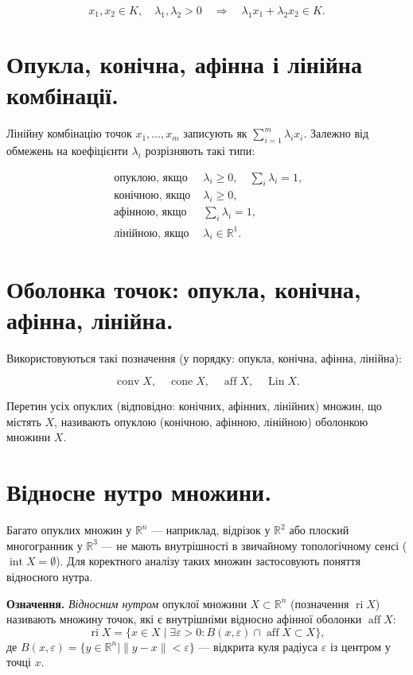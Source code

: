 \documentclass[12pt,a4paper]{extarticle}
\numberwithin{section}{part}
\begin{document}
$$
x_{1}, x_{2} \in K, \quad \lambda_{1}, \lambda_{2}>0 \quad \Longrightarrow \quad \lambda_{1} x_{1}+\lambda_{2} x_{2} \in K .
$$

\section{Опукла, конічна, афінна і лінійна комбінації.}
Лінійну комбінацію точок $x_{1}, \ldots, x_{m}$ записують як $\sum_{i=1}^{m} \lambda_{i} x_{i}$. Залежно від обмежень на коефіцієнти $\lambda_i$ розрізняють такі типи:

$$
\begin{array}{ll}
\text { опуклою, якщо } & \lambda_{i} \geq 0, \quad \sum_{i} \lambda_{i}=1, \\
\text { конічною, якщо } & \lambda_{i} \geq 0, \\
\text { афінною, якщо } & \sum_{i} \lambda_{i}=1, \\
\text { лінійною, якщо } & \lambda_{i} \in \mathbb{R}^{1} .
\end{array}
$$

\section{Оболонка точок: опукла, конічна, афінна, лінійна.}
Використовуються такі позначення (у порядку: опукла, конічна, афінна, лінійна):

$$
\operatorname{conv} X, \quad \operatorname{cone} X, \quad \operatorname{aff} X, \quad \operatorname{Lin} X .
$$

Перетин усіх опуклих (відповідно: конічних, афінних, лінійних) множин, що містять $X$, називають опуклою (конічною, афінною, лінійною) оболонкою множини $X$.

\section{Відносне нутро множини.}
Багато опуклих множин у $\mathbb{R}^n$ --- наприклад, відрізок у $\mathbb{R}^2$ або плоский многогранник у $\mathbb{R}^3$ --- не мають внутрішності в звичайному топологічному сенсі ($\operatorname{int} X = \emptyset$). Для коректного аналізу таких множин застосовують поняття відносного нутра.

\textbf{Означення.} \textit{Відносним нутром} опуклої множини $X \subset \mathbb{R}^n$ (позначення $\operatorname{ri} X$) називають множину точок, які є внутрішніми відносно афінної оболонки $\operatorname{aff} X$:
$$
\operatorname{ri} X = \{ x \in X \mid \exists \varepsilon > 0 : B(x, \varepsilon) \cap \operatorname{aff} X \subset X \},
$$
де $B(x, \varepsilon) = \{ y \in \mathbb{R}^n \mid \|y - x\| < \varepsilon \}$ --- відкрита куля радіуса $\varepsilon$ із центром у точці $x$.
\end{document}
